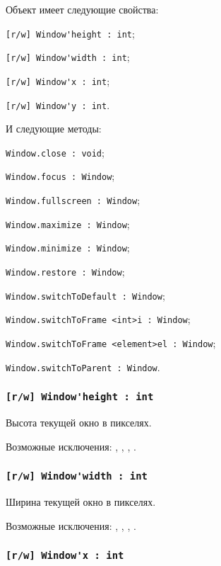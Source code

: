 Объект \window{} имеет следующие свойства:
\begin{icItems}
	\item \lstinline|[r/w] Window'height : int|;
	\item \lstinline|[r/w] Window'width : int|;
	\item \lstinline|[r/w] Window'x : int|;
	\item \lstinline|[r/w] Window'y : int|.
\end{icItems}

И следующие методы:
\begin{icItems}
	\item \lstinline|Window.close : void|;
	\item \lstinline|Window.focus : Window|;
	\item \lstinline|Window.fullscreen : Window|;
	\item \lstinline|Window.maximize : Window|;
	\item \lstinline|Window.minimize : Window|;
	\item \lstinline|Window.restore : Window|;
	\item \lstinline|Window.switchToDefault : Window|;
	\item \lstinline|Window.switchToFrame <int>i : Window|;
	\item \lstinline|Window.switchToFrame <element>el : Window|;
	\item \lstinline|Window.switchToParent : Window|.
\end{icItems}

\subsubsection{\lstinline|[r/w] Window'height : int|}

Высота текущей окно в пикселях.

Возможные исключения: , , , .

\subsubsection{\lstinline|[r/w] Window'width : int|}

Ширина текущей окно в пикселях.

Возможные исключения: , , , .

\subsubsection{\lstinline|[r/w] Window'x : int|}

